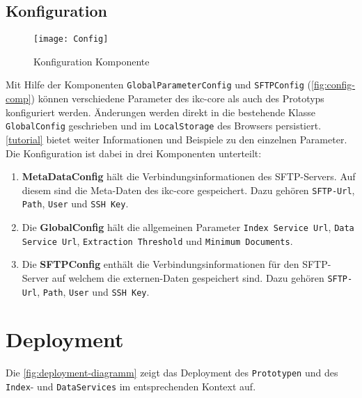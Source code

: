     
\subsection{Konfiguration}

    \begin{figure}[H]
    \centering
    \texttt{[image: Config]}
    \caption{Konfiguration Komponente}
    \label{fig:config-comp}
    \end{figure}

Mit Hilfe der Komponenten \texttt{GlobalParameterConfig} und \texttt{SFTP\-Con\-fig} (\autoref{fig:config-comp}) können verschiedene Parameter des \gls{ikc-core} als auch des Prototyps konfiguriert werden. Änderungen werden direkt in die bestehende Klasse \texttt{GlobalConfig} geschrieben und im \texttt{Lo\-cal\-Stor\-age} des Browsers persistiert. \autoref{tutorial} bietet weiter Informationen und Beispiele zu den einzelnen Parameter. Die Konfiguration ist dabei in drei Komponenten unterteilt:
\begin{enumerate}
    \item \textbf{MetaDataConfig} hält die Verbindungsinformationen des \gls{SFTP}-Servers. Auf diesem sind die Meta-Daten des \gls{ikc-core} gespeichert. Dazu gehören \texttt{SFTP-Url}, \texttt{Path}, \texttt{User} und \texttt{SSH Key}.
    \item Die \textbf{GlobalConfig} hält die allgemeinen Parameter \texttt{In\-dex Ser\-vice Url}, \texttt{Data Service Url}, \texttt{Extraction Threshold} und \texttt{Mi\-ni\-mum Docu\-ments}.
    \item Die \textbf{SFTPConfig} enthält die Verbindungsinformationen für den \gls{SFTP}-Server auf welchem die externen-Daten gespeichert sind. Dazu gehören \texttt{SFTP-Url}, \texttt{Path}, \texttt{User} und \texttt{SSH Key}.
\end{enumerate}








\section{Deployment}



Die \autoref{fig:deployment-diagramm} zeigt das Deployment des \texttt{Prototypen} und des \texttt{Index}- und \texttt{DataServices} im entsprechenden Kontext auf.

